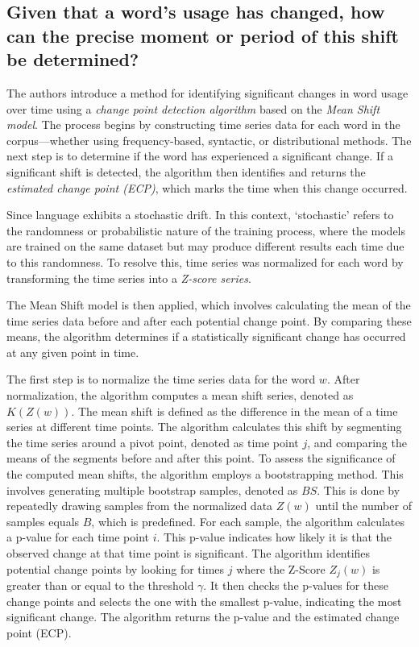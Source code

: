 
\subsection{Given that a word's usage has changed, how can the precise moment or period of this shift be determined?} \label{subsec:kulkarni-rq2}
The authors introduce a method for identifying significant changes in word usage over time using a \emph{change point detection algorithm} based on the \emph{Mean Shift model}.
The process begins by constructing time series data for each word in the corpus—whether using frequency-based, syntactic, or distributional methods.
The next step is to determine if the word has experienced a significant change.
If a significant shift is detected, the algorithm then identifies and returns the \emph{estimated change point (ECP)}, which marks the time when this change occurred.

Since language exhibits a stochastic drift.
In this context, `stochastic' refers to the randomness or probabilistic nature of the training process,
where the models are trained on the same dataset but may produce different results each time due to this randomness.
To resolve this, time series was normalized for each word by transforming the time series into a \emph{Z-score series}.

The Mean Shift model is then applied, which involves calculating the mean of the time series data before and after each potential change point.
By comparing these means, the algorithm determines if a statistically significant change has occurred at any given point in time.

The first step is to normalize the time series data for the word $w$.
After normalization, the algorithm computes a mean shift series, denoted as $K(Z(w))$.
The mean shift is defined as the difference in the mean of a time series at different time points.
The algorithm calculates this shift by segmenting the time series around a pivot point, denoted as time point $j$, and comparing the means of the segments before and after this point.
To assess the significance of the computed mean shifts, the algorithm employs a bootstrapping method.
This involves generating multiple bootstrap samples, denoted as $BS$.
This is done by repeatedly drawing samples from the normalized data $Z(w)$ until the number of samples equals $B$, which is predefined.
For each sample, the algorithm calculates a p-value for each time point $i$.
This p-value indicates how likely it is that the observed change at that time point is significant.
The algorithm identifies potential change points by looking for times $j$ where the Z-Score $Z_j(w)$ is greater than or equal to the threshold $\gamma$.
It then checks the p-values for these change points and selects the one with the smallest p-value, indicating the most significant change.
The algorithm returns the p-value and the estimated change point (ECP).

